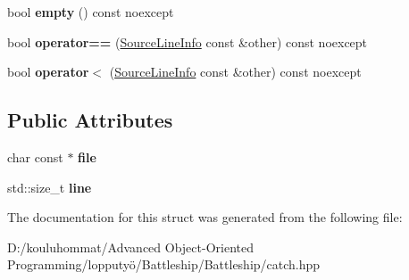 \begin{DoxyCompactItemize}
bool {\bfseries empty} () const noexcept
\item 
\mbox{\label{struct_catch_1_1_source_line_info_af07e4fdeddf8409b91e4f842f6264cf8}} 
bool {\bfseries operator==} (\mbox{\hyperlink{struct_catch_1_1_source_line_info}{Source\+Line\+Info}} const \&other) const noexcept
\item 
\mbox{\label{struct_catch_1_1_source_line_info_af77415416919d2d6030b4be085b92f7a}} 
bool {\bfseries operator$<$} (\mbox{\hyperlink{struct_catch_1_1_source_line_info}{Source\+Line\+Info}} const \&other) const noexcept
\end{DoxyCompactItemize}
\subsection*{Public Attributes}
\begin{DoxyCompactItemize}
\item 
\mbox{\label{struct_catch_1_1_source_line_info_ad65537703e9f08c1fa7777fbc3f0c617}} 
char const  $\ast$ {\bfseries file}
\item 
\mbox{\label{struct_catch_1_1_source_line_info_a841e5d696c7b9cde24e45e61dd979c77}} 
std\+::size\+\_\+t {\bfseries line}
\end{DoxyCompactItemize}


The documentation for this struct was generated from the following file\+:\begin{DoxyCompactItemize}
\item 
D\+:/kouluhommat/\+Advanced Object-\/\+Oriented Programming/lopputyö/\+Battleship/\+Battleship/catch.\+hpp\end{DoxyCompactItemize}
